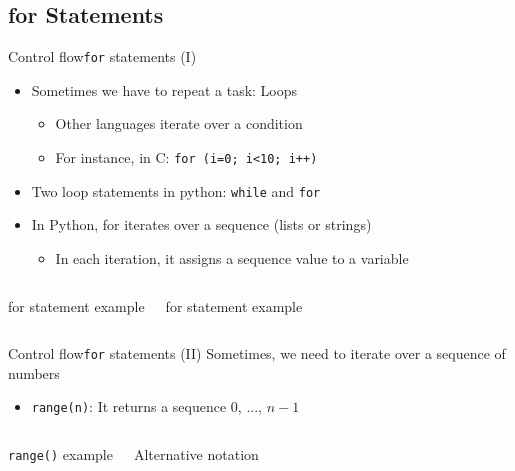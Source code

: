 \documentclass[10pt,compress]{beamer} %
\begin{document}
\subsection{for Statements}
\begin{frame}{Control flow}{\texttt{for} statements (I)}
	\begin{itemize}
		\item Sometimes we have to repeat a task: Loops
			\begin{itemize}
			\item Other languages iterate over a condition
			\item For instance, in C: \texttt{for (i=0; i<10; i++)}
			\end{itemize}
		\item Two loop statements in python: \texttt{while} and \texttt{for}
		\item In Python, for iterates over a sequence (lists or strings)
			\begin{itemize}
			\item In each iteration, it assigns a sequence value to a variable
			\end{itemize}
	\end{itemize}

    \begin{columns}
		\begin{exampleblock}{for statement example}
		
		\end{exampleblock}

		\begin{exampleblock}{for statement example}
		
		\end{exampleblock}
	\end{columns}
\end{frame}

\begin{frame}{Control flow}{\texttt{for} statements (II)}
	Sometimes, we need to iterate over a sequence of numbers
	\begin{itemize}
		\item \texttt{range(n)}: It returns a sequence $0$, ..., $n-1$
	\end{itemize}

    \begin{columns}
		\begin{exampleblock}{\texttt{range()} example}
		
		\end{exampleblock}
		
		\begin{exampleblock}{Alternative notation}
		
		\end{exampleblock}
	\end{columns}
\end{frame}
\end{document}
